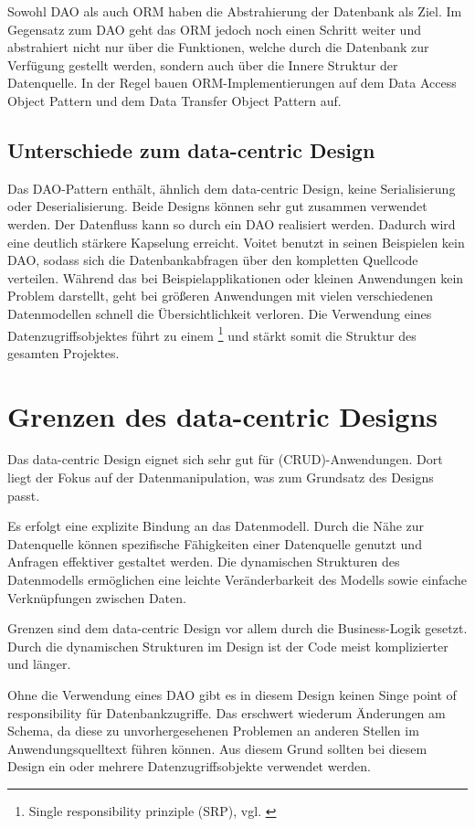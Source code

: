 Sowohl DAO als auch ORM haben die Abstrahierung der Datenbank als Ziel. Im Gegensatz zum DAO geht das ORM jedoch noch einen Schritt weiter und abstrahiert nicht nur über die Funktionen, welche durch die Datenbank zur Verfügung gestellt werden, sondern auch über die Innere Struktur der Datenquelle. In der Regel bauen ORM-Implementierungen auf dem Data Access Object Pattern und dem Data Transfer Object Pattern auf.

\subsection{Unterschiede zum data-centric Design}
Das DAO-Pattern enthält, ähnlich dem data-centric Design, keine Serialisierung oder Deserialisierung. Beide Designs können sehr gut zusammen verwendet werden. Der Datenfluss kann so durch ein DAO realisiert werden. Dadurch wird eine deutlich stärkere Kapselung erreicht. Voitet benutzt in seinen Beispielen kein DAO, sodass sich die Datenbankabfragen über den kompletten Quellcode verteilen. Während das bei Beispielapplikationen oder kleinen Anwendungen kein Problem darstellt, geht bei größeren Anwendungen mit vielen verschiedenen Datenmodellen schnell die Übersichtlichkeit verloren. Die Verwendung eines Datenzugriffsobjektes führt zu einem \footnote{ Single responsibility prinziple (SRP), vgl. \cite[p.~339]{design-patterns}}
 und stärkt somit die Struktur des gesamten Projektes. 

\section{Grenzen des data-centric Designs}
Das data-centric Design eignet sich sehr gut für  (CRUD)-Anwendungen. Dort liegt der Fokus auf der Datenmanipulation, was zum Grundsatz des Designs passt.

Es erfolgt eine explizite Bindung an das Datenmodell. Durch die Nähe zur Datenquelle können spezifische Fähigkeiten einer Datenquelle genutzt und Anfragen effektiver gestaltet werden. Die dynamischen Strukturen des Datenmodells ermöglichen eine leichte Veränderbarkeit des Modells sowie einfache Verknüpfungen zwischen Daten.

Grenzen sind dem data-centric Design vor allem durch die Business-Logik gesetzt. Durch die dynamischen Strukturen im Design ist der Code meist komplizierter und länger.

Ohne die Verwendung eines DAO gibt es in diesem Design keinen Singe point of responsibility für Datenbankzugriffe. Das erschwert wiederum Änderungen am Schema, da diese zu unvorhergesehenen Problemen an anderen Stellen im Anwendungsquelltext führen können. Aus diesem Grund sollten bei diesem Design ein oder mehrere Datenzugriffsobjekte verwendet werden.

